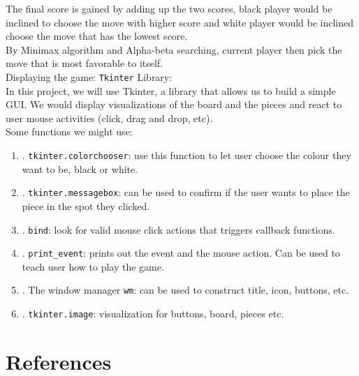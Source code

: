 \documentclass[fontsize=11pt]{article}
\begin{document}
\textbullet \hspace{2mm} The final score is gained by adding up the two scores, black player would be inclined to choose the move with higher score and white player would be inclined choose the move that has the lowest score.\\

\textbullet \hspace{2mm} By Minimax algorithm and Alpha-beta searching, current player then pick the move that is most favorable to itself.\\

\textbullet \hspace{2mm} Displaying the game: \texttt{Tkinter} Library: \\

In this project, we will use Tkinter, a library that allows us to build a simple GUI. We would display visualizations of the board and the pieces and react to user mouse activities (click, drag and drop, etc). \\

Some functions we might use: 
\begin{enumerate}
    \item. \texttt{tkinter.colorchooser}: use this function to let user choose the colour they want to be, black or white. 
    
    \item. \texttt{tkinter.messagebox}: can be used to confirm if the user wants to place the piece in the spot they clicked. 
    
    \item. \texttt{bind}: look for valid mouse click actions that triggers callback functions. 
    
    \item. \texttt{print\_event}: prints out the event and the mouse action. Can be used to teach user how to play the game. 
    \item. The window manager \texttt{wm}: can be used to construct title, icon, buttons, etc. 
    
    \item. \texttt{tkinter.image}: visualization for buttons, board, pieces etc. 
    
\end{enumerate}

\section*{References}
\end{document}
